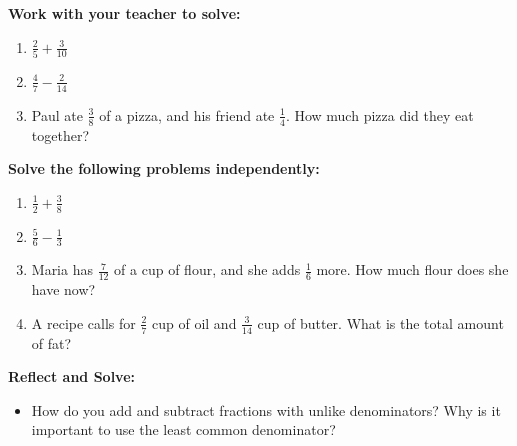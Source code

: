 \documentclass[12pt]{article}
\begin{document}
\vspace{1em}

\begin{tcolorbox}[colframe=black!60, colback=white, 
coltitle=black, colbacktitle=black!15, fonttitle=\bfseries\Large, 
title=Guided Practice, halign title=center, left=10pt, right=10pt, top=10pt, bottom=15pt]
\textbf{Work with your teacher to solve:}
\begin{enumerate}[itemsep=2em]
    \item \( \frac{2}{5} + \frac{3}{10} \)
    \item \( \frac{4}{7} - \frac{2}{14} \)
    \item Paul ate \( \frac{3}{8} \) of a pizza, and his friend ate \( \frac{1}{4} \). How much pizza did they eat together?
\end{enumerate}
\end{tcolorbox}

\vspace{1em}

\begin{tcolorbox}[colframe=black!60, colback=white, 
coltitle=black, colbacktitle=black!15, fonttitle=\bfseries\Large, 
title=Independent Practice, halign title=center, left=10pt, right=10pt, top=10pt, bottom=15pt]
\textbf{Solve the following problems independently:}
\begin{enumerate}[itemsep=2em]
    \item \( \frac{1}{2} + \frac{3}{8} \)
    \item \( \frac{5}{6} - \frac{1}{3} \)
    \item Maria has \( \frac{7}{12} \) of a cup of flour, and she adds \( \frac{1}{6} \) more. How much flour does she have now?
    \item A recipe calls for \( \frac{2}{7} \) cup of oil and \( \frac{3}{14} \) cup of butter. What is the total amount of fat?
\end{enumerate}
\end{tcolorbox}

\vspace{1em}

\begin{tcolorbox}[colframe=black!60, colback=white, 
coltitle=black, colbacktitle=black!15, fonttitle=\bfseries\Large, 
title=Exit Ticket, halign title=center, left=10pt, right=10pt, top=10pt, bottom=15pt]
\textbf{Reflect and Solve:}
\begin{itemize}
    \item How do you add and subtract fractions with unlike denominators? Why is it important to use the least common denominator?
\end{itemize}
\end{tcolorbox}
\end{document}
